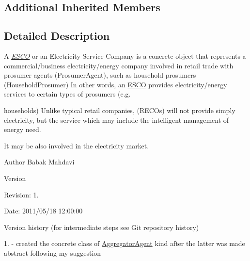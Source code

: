 \subsection*{Additional Inherited Members}


\subsection{Detailed Description}
A {\itshape \hyperlink{classuk_1_1ac_1_1dmu_1_1iesd_1_1cascade_1_1agents_1_1aggregators_1_1_e_s_c_o}{E\-S\-C\-O}} or an Electricity Service Company is a concrete object that represents a commercial/business electricity/energy company involved in retail trade with prosumer agents ({\ttfamily Prosumer\-Agent}), such as household prosumers ({\ttfamily Household\-Prosumer}) In other words, an {\ttfamily \hyperlink{classuk_1_1ac_1_1dmu_1_1iesd_1_1cascade_1_1agents_1_1aggregators_1_1_e_s_c_o}{E\-S\-C\-O}} provides electricity/energy services to certain types of prosumers (e.\-g. 

households) Unlike typical retail companies, ({\ttfamily R\-E\-C\-O}s) will not provide simply electricity, but the service which may include the intelligent management of energy need. 

It may be also involved in the electricity market.

\begin{DoxyAuthor}{Author}
Babak Mahdavi 
\end{DoxyAuthor}
\begin{DoxyVersion}{Version}

\end{DoxyVersion}
\begin{DoxyParagraph}{Revision\-:}
1. 
\end{DoxyParagraph}
\begin{DoxyParagraph}{Date\-:}
2011/05/18 12\-:00\-:00 
\end{DoxyParagraph}


Version history (for intermediate steps see Git repository history)

1. -\/ created the concrete class of \hyperlink{classuk_1_1ac_1_1dmu_1_1iesd_1_1cascade_1_1agents_1_1aggregators_1_1_aggregator_agent}{Aggregator\-Agent} kind after the latter was made abstract following my suggestion 

